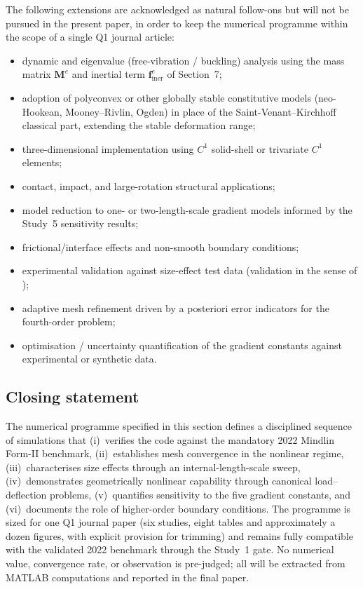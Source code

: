 \documentclass[11pt]{article}
\begin{document}
The following extensions are acknowledged as natural follow-ons
but will not be pursued in the present paper, in order to keep
the numerical programme within the scope of a single Q1 journal
article:
\begin{itemize}
  \item dynamic and eigenvalue (free-vibration / buckling)
    analysis using the mass matrix $\mathbf{M}^{e}$ and
    inertial term $\mathbf{f}_{\mathrm{iner}}^{e}$ of
    Section~7;
  \item adoption of polyconvex or other globally stable
    constitutive models (neo-Hookean, Mooney--Rivlin, Ogden)
    in place of the Saint-Venant--Kirchhoff classical part,
    extending the stable deformation range;
  \item three-dimensional implementation using $C^1$
    solid-shell or trivariate $C^1$ elements;
  \item contact, impact, and large-rotation structural
    applications;
  \item model reduction to one- or two-length-scale
    gradient models informed by the Study~5 sensitivity
    results;
  \item frictional/interface effects and non-smooth
    boundary conditions;
  \item experimental validation against size-effect test
    data (validation in the sense of
    \cite{OberkampfTrucano2002,ASME_Verification_2012});
  \item adaptive mesh refinement driven by a posteriori
    error indicators for the fourth-order problem;
  \item optimisation / uncertainty quantification of the
    gradient constants against experimental or synthetic
    data.
\end{itemize}

\subsection{Closing statement}
\label{ssec:s9_closing}

The numerical programme specified in this section defines a
disciplined sequence of simulations that (i)~verifies the
code against the mandatory 2022 Mindlin Form-II benchmark,
(ii)~establishes mesh convergence in the nonlinear regime,
(iii)~characterises size effects through an internal-length-scale
sweep, (iv)~demonstrates geometrically nonlinear capability
through canonical load--deflection problems, (v)~quantifies
sensitivity to the five gradient constants, and (vi)~documents
the role of higher-order boundary conditions.  The programme
is sized for one Q1 journal paper (six studies, eight tables
and approximately a dozen figures, with explicit provision
for trimming) and remains fully compatible with the validated
2022 benchmark through the Study~1 gate.  No numerical value,
convergence rate, or observation is pre-judged; all will be
extracted from MATLAB computations and reported in the final
paper.



\end{document}

